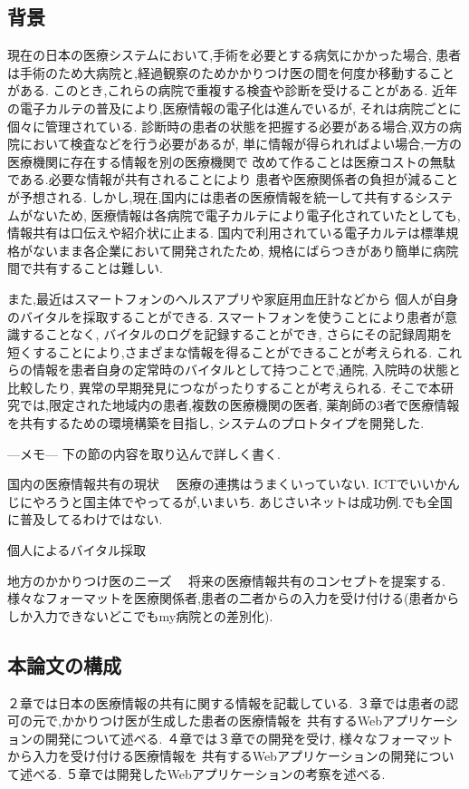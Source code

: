\subsection{背景}
  現在の日本の医療システムにおいて,手術を必要とする病気にかかった場合,
  患者は手術のため大病院と,経過観察のためかかりつけ医の間を何度か移動することがある.
  このとき,これらの病院で重複する検査や診断を受けることがある.
  近年の電子カルテの普及により,医療情報の電子化は進んでいるが,
  それは病院ごとに個々に管理されている.
  診断時の患者の状態を把握する必要がある場合,双方の病院において検査などを行う必要があるが,
  単に情報が得られればよい場合,一方の医療機関に存在する情報を別の医療機関で
  改めて作ることは医療コストの無駄である.必要な情報が共有されることにより
  患者や医療関係者の負担が減ることが予想される.
  しかし,現在,国内には患者の医療情報を統一して共有するシステムがないため,
  医療情報は各病院で電子カルテにより電子化されていたとしても,
  情報共有は口伝えや紹介状に止まる.
  国内で利用されている電子カルテは標準規格がないまま各企業において開発されたため,
  規格にばらつきがあり簡単に病院間で共有することは難しい.

  また,最近はスマートフォンのヘルスアプリや家庭用血圧計などから
  個人が自身のバイタルを採取することができる.
  スマートフォンを使うことにより患者が意識することなく,
  バイタルのログを記録することができ,
  さらにその記録周期を短くすることにより,さまざまな情報を得ることができることが考えられる.
  これらの情報を患者自身の定常時のバイタルとして持つことで,通院,
  入院時の状態と比較したり,
  異常の早期発見につながったりすることが考えられる.
  そこで本研究では,限定された地域内の患者,複数の医療機関の医者,
  薬剤師の3者で医療情報を共有するための環境構築を目指し,
  システムのプロトタイプを開発した.

  ---メモ---
    下の節の内容を取り込んで詳しく書く.

  国内の医療情報共有の現状
  　医療の連携はうまくいっていない.
    ICTでいいかんじにやろうと国主体でやってるが,いまいち.
    あじさいネットは成功例.でも全国に普及してるわけではない.\cite{bibi3}

  個人によるバイタル採取

  地方のかかりつけ医のニーズ
  　将来の医療情報共有のコンセプトを提案する.
    様々なフォーマットを医療関係者,患者の二者からの入力を受け付ける(患者からしか入力できないどこでもmy病院との差別化).

\subsection{本論文の構成}
  ２章では日本の医療情報の共有に関する情報を記載している.
  ３章では患者の認可の元で,かかりつけ医が生成した患者の医療情報を
  共有するWebアプリケーションの開発について述べる.
  ４章では３章での開発を受け,
  様々なフォーマットから入力を受け付ける医療情報を
  共有するWebアプリケーションの開発について述べる.
  ５章では開発したWebアプリケーションの考察を述べる.
